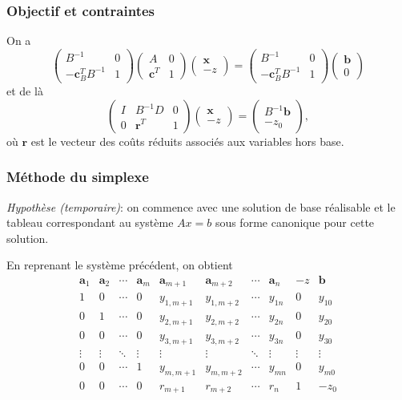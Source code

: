 \documentclass[t,usepdftitle=false]{beamer}
\def\ba{\boldsymbol{a}}
\def\bb{\boldsymbol{b}}
\def\bc{\boldsymbol{c}}
\def\br{\boldsymbol{r}}
\def\bx{\boldsymbol{x}}
\begin{document}
\begin{frame}
\frametitle{Objectif et contraintes}

On a
$$
\begin{pmatrix}
	B^{-1} & 0 \\
	-\bc_B^TB^{-1} & 1 
\end{pmatrix}
\begin{pmatrix}
	A & 0 \\
	\bc^T & 1 
\end{pmatrix}
\begin{pmatrix}
	\bx \\
	-z 
\end{pmatrix}
=
\begin{pmatrix}
	B^{-1} & 0 \\
	-\bc_B^TB^{-1} & 1 
\end{pmatrix}
\begin{pmatrix}
	\bb \\
	0
\end{pmatrix}
$$
et de là
$$
\begin{pmatrix}
	I & B^{-1}D & 0 \\
	0 & \br^T & 1 
\end{pmatrix}
\begin{pmatrix}
	\bx \\
	-z 
\end{pmatrix}
=
\begin{pmatrix}
	B^{-1}\bb \\
	 -z_0
\end{pmatrix},
$$
où $\br$ est le vecteur des coûts réduits associés aux variables hors base.

\end{frame}

\begin{frame}
\frametitle{Méthode du simplexe}

\textit{Hypothèse (temporaire)}: on commence avec une solution de base réalisable et le tableau correspondant au système $Ax = b$ sous forme canonique pour cette solution.

\mbox{}

En reprenant le système précédent, on obtient
$$
\begin{matrix}
\ba_1 & \ba_2 & \cdots & \ba_m & \ba_{m+1} &
\ba_{m+2} & \cdots & \ba_n & -z & \bb \\
1 & 0 & \cdots & 0 & y_{1,m+1} & y_{1,m+2} & \cdots & y_{1n} & 0 & y_{10} \\
0 & 1 & \cdots & 0 & y_{2,m+1} & y_{2,m+2} & \cdots & y_{2n} & 0 & y_{20} \\
0 & 0 & \cdots & 0 & y_{3,m+1} & y_{3,m+2} & \cdots & y_{3n} & 0 & y_{30} \\
\vdots & \vdots & \ddots & \vdots & \vdots & \vdots & \ddots & \vdots & \vdots & \vdots \\
0 & 0 & \cdots & 1 & y_{m,m+1} & y_{m,m+2} & \cdots & y_{mn} & 0 & y_{m0} \\
0 & 0 & \cdots & 0 & r_{m+1} & r_{m+2} & \cdots & r_n & 1 & -z_0
\end{matrix}
$$

\end{frame}
\end{document}
